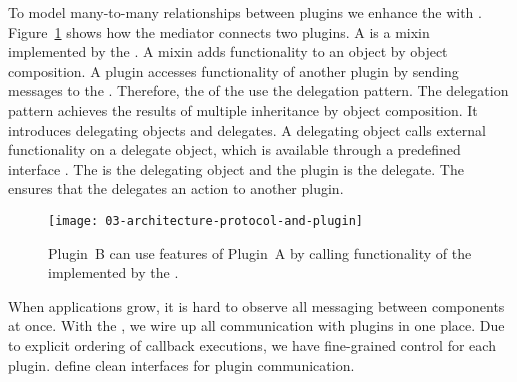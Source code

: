 \documentclass[../../ClassicThesis.tex]{subfiles}
\begin{document}
To model many-to-many relationships between plugins we
enhance the  with .
Figure~\ref{fig:protocol-and-plugin} shows how the mediator
connects two plugins. A  is a mixin
implemented by the . A mixin adds
functionality to an object by object
composition\cite[p.~81]{js-design-patterns}.
A plugin accesses functionality of another plugin by sending
messages to the . Therefore, the
 of the  use the
delegation pattern.
The delegation pattern achieves the results of multiple
inheritance by object composition. It introduces delegating
objects and delegates. A delegating object calls external
functionality on a delegate object, which is available
through a predefined interface \cite{delegation-pattern}.
The  is the delegating object and the
plugin is the delegate.
The  ensures that the 
delegates an action to another plugin.

\begin{figure}[h]
  \centering
  \texttt{[image: 03-architecture-protocol-and-plugin]}
  \caption{Plugin~B can use features of Plugin~A by calling functionality of the  implemented by the .}
  \label{fig:protocol-and-plugin}
\end{figure}

When applications grow, it is hard to observe all messaging
between components at once. With the , we
wire up all communication with plugins in one place. Due to
explicit ordering of callback executions, we have
fine-grained control for each plugin. 
define clean interfaces for plugin communication.

\end{document}
